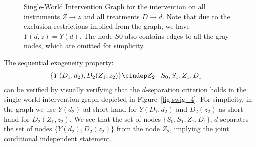 \begin{figure}[H]
\caption{
  Single-World Intervention Graph for the intervention on all instruments $Z\to z$ and all treatments $D\to d$. Note that due to the exclusion restrictions implied from the graph, we have $Y(d, z) = Y(d)$. The node $S0$ also contains edges to all the gray nodes, which are omitted for simplicity.
}\label{fig:swig_3}
\end{figure}


The sequential exogeneity property:
\begin{align}
    \{Y(D_1, d_2), D_2(Z_1, z_2)\} \cindep& Z_2 \mid S_0, S_1, Z_1, D_1
\end{align}
can be verified by visually verifying that the $d$-separation criterion holds in the single-world intervention graph depicted in Figure~\ref{fig:swig_4}. For simplicity, in the graph we use $Y(d_2)$ ad short hand for $Y(D_1, d_2)$ and $D_2(z_2)$ as short hand for $D_2(Z_1, z_2)$. We see that the set of nodes $\{S_0, S_1, Z_1, D_1\}$, $d$-separates the set of nodes $\{Y(d_2), D_2(z_2)\}$ from the node $Z_2$, implying the joint conditional independent statement.

